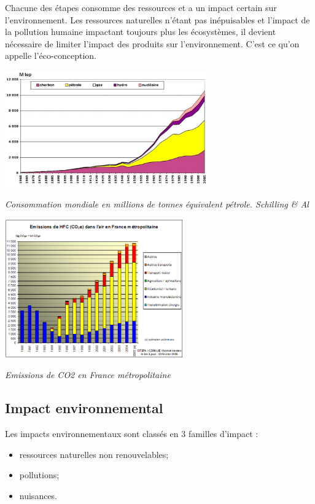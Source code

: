 \documentclass[11pt,oneside]{article}
\begin{document}
Chacune des étapes consomme des ressources et a un impact certain sur l'environnement. Les ressources naturelles n'étant pas inépuisables et l'impact de la pollution humaine impactant toujours plus les écosystèmes, il devient nécessaire de limiter l'impact des produits sur l'environnement. C'est ce qu'on appelle l'éco-conception. 

\noindent\begin{minipage}[c]{.47\linewidth}
\begin{center}
\includegraphics[height=5cm]{png/consommation_energie}

\textit{Consommation mondiale en millions de tonnes équivalent pétrole. Schilling \& Al}
\end{center}
\end{minipage}\hfill
\begin{minipage}[c]{.47\linewidth} 
\begin{center}
\includegraphics[height=6cm]{png/emission_CO2}

\textit{Emissions de CO2 en France métropolitaine}
\end{center}
\end{minipage}


\subsection{Impact environnemental}

Les impacts environnementaux sont classés en 3 familles d'impact :
\begin{itemize}
\item ressources naturelles non renouvelables; 
\item pollutions;
\item nuisances.
\end{itemize}
\end{document}
